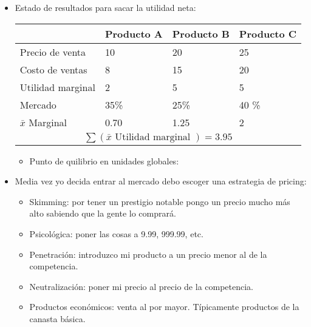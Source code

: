 \begin{itemize}
    
    \item Estado de resultados para sacar la utilidad neta:
        \begin{center}
           \begin{tabular}{ | p{3cm} | p{2cm} | p{2cm} | p{2cm} | }
               \hline
                    & Producto A & Producto B & Producto C    \\
               \hline
                    Precio de venta & 10 & 20 & 25 \\ 
                    Costo de ventas & 8 & 15 & 20 \\ 
                \hline
                    Utilidad marginal & 2 & 5 & 5 \\ 
                    Mercado & 35\% & 25\% & 40 \% \\ 
                \hline
                    $\bar{x}$ Marginal & 0.70 & 1.25 & 2 \\ \hline 
                    \multicolumn{4}{|c|}{$\sum (\bar{x} \text{  Utilidad marginal  }) = 3.95$} \\ 
                \hline
           \end{tabular}
        \end{center}
        \begin{itemize}
            \item Punto de quilibrio en unidades globales:
                \begin{center}
                \end{center}
        \end{itemize}
    
    \item Media vez yo decida entrar al mercado debo escoger una estrategia de pricing:
        \begin{itemize}
            \item Skimming: por tener un prestigio notable pongo un precio mucho más alto sabiendo que la gente lo comprará.
            \item Psicológica: poner las cosas a 9.99, 999.99, etc. 
            \item Penetración: introduzco mi producto a un precio menor al de la competencia.
            \item Neutralización: poner mi precio al precio de la competencia.
            \item Productos económicos: venta al por mayor. Típicamente productos de la canasta básica.
        \end{itemize}
\end{itemize}
